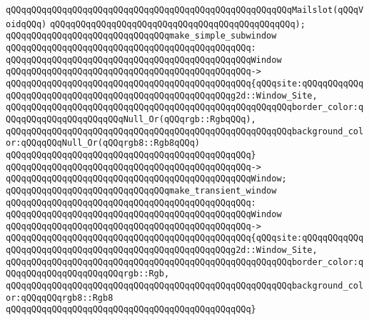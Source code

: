 \verb|qQQqqQQqqQQqqQQqqQQqqQQqqQQqqQQqqQQqqQQqqQQqqQQqqQQqqQQqMailslot(qQQqVoidqQQq)|\newline
\verb|qQQqqQQqqQQqqQQqqQQqqQQqqQQqqQQqqQQqqQQqqQQqqQQq);|\newline
\newline
\verb|qQQqqQQqqQQqqQQqqQQqqQQqqQQqqQQqmake_simple_subwindow|\newline
\verb|qQQqqQQqqQQqqQQqqQQqqQQqqQQqqQQqqQQqqQQqqQQqqQQq:|\newline
\verb|qQQqqQQqqQQqqQQqqQQqqQQqqQQqqQQqqQQqqQQqqQQqqQQqWindow|\newline
\verb|qQQqqQQqqQQqqQQqqQQqqQQqqQQqqQQqqQQqqQQqqQQqqQQq->|\newline
\verb|qQQqqQQqqQQqqQQqqQQqqQQqqQQqqQQqqQQqqQQqqQQqqQQq{qQQqsite:qQQqqQQqqQQqqQQqqQQqqQQqqQQqqQQqqQQqqQQqqQQqqQQqqQQqqQQqg2d::Window_Site,|\newline
\verb|qQQqqQQqqQQqqQQqqQQqqQQqqQQqqQQqqQQqqQQqqQQqqQQqqQQqqQQqborder_color:qQQqqQQqqQQqqQQqqQQqqQQqNull_Or(qQQqrgb::RgbqQQq),|\newline
\verb|qQQqqQQqqQQqqQQqqQQqqQQqqQQqqQQqqQQqqQQqqQQqqQQqqQQqqQQqbackground_color:qQQqqQQqNull_Or(qQQqrgb8::Rgb8qQQq)|\newline
\verb|qQQqqQQqqQQqqQQqqQQqqQQqqQQqqQQqqQQqqQQqqQQqqQQq}|\newline
\verb|qQQqqQQqqQQqqQQqqQQqqQQqqQQqqQQqqQQqqQQqqQQqqQQq->|\newline
\verb|qQQqqQQqqQQqqQQqqQQqqQQqqQQqqQQqqQQqqQQqqQQqqQQqWindow;|\newline
\newline
\verb|qQQqqQQqqQQqqQQqqQQqqQQqqQQqqQQqmake_transient_window|\newline
\verb|qQQqqQQqqQQqqQQqqQQqqQQqqQQqqQQqqQQqqQQqqQQqqQQq:|\newline
\verb|qQQqqQQqqQQqqQQqqQQqqQQqqQQqqQQqqQQqqQQqqQQqqQQqWindow|\newline
\verb|qQQqqQQqqQQqqQQqqQQqqQQqqQQqqQQqqQQqqQQqqQQqqQQq->|\newline
\verb|qQQqqQQqqQQqqQQqqQQqqQQqqQQqqQQqqQQqqQQqqQQqqQQq{qQQqsite:qQQqqQQqqQQqqQQqqQQqqQQqqQQqqQQqqQQqqQQqqQQqqQQqqQQqqQQqg2d::Window_Site,|\newline
\verb|qQQqqQQqqQQqqQQqqQQqqQQqqQQqqQQqqQQqqQQqqQQqqQQqqQQqqQQqborder_color:qQQqqQQqqQQqqQQqqQQqqQQqrgb::Rgb,|\newline
\verb|qQQqqQQqqQQqqQQqqQQqqQQqqQQqqQQqqQQqqQQqqQQqqQQqqQQqqQQqbackground_color:qQQqqQQqrgb8::Rgb8|\newline
\verb|qQQqqQQqqQQqqQQqqQQqqQQqqQQqqQQqqQQqqQQqqQQqqQQq}|\newline

